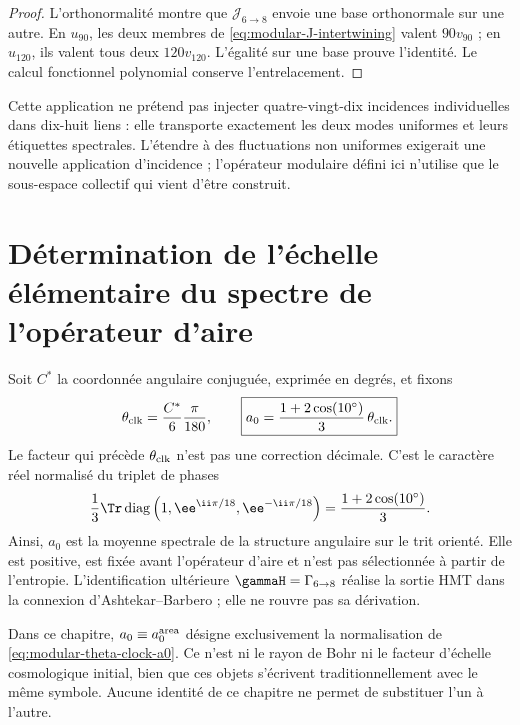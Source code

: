 \begin{proof}
L'orthonormalité montre que \(\mathcal J_{6\to8}\) envoie une base
orthonormale sur une autre. En \(u_{90}\), les deux membres de
\cref{eq:modular-J-intertwining} valent \(90v_{90}\) ; en \(u_{120}\),
ils valent tous deux \(120v_{120}\). L'égalité sur une base prouve l'identité.
Le calcul fonctionnel polynomial conserve l'entrelacement.
\end{proof}

Cette application ne prétend pas injecter quatre-vingt-dix incidences individuelles dans
dix-huit liens : elle transporte exactement les deux modes uniformes et leurs
étiquettes spectrales. L'étendre à des fluctuations non uniformes exigerait
une nouvelle application d'incidence ; l'opérateur modulaire défini ici n'utilise que
le sous-espace collectif qui vient d'être construit.

\section{Détermination de l'échelle élémentaire du spectre de l'opérateur d'aire}

Soit \(C^*\) la coordonnée angulaire conjuguée, exprimée en degrés, et fixons
\begin{equation}
\label{eq:modular-theta-clock-a0}
\theta_{\rm clk}=\frac{C^*}{6}\frac{\pi}{180},
\qquad
\boxed{
a_0=\frac{1+2\cos(10^\circ)}{3}\,\theta_{\rm clk}.}
\end{equation}
Le facteur qui précède \(\theta_{\rm clk}\) n'est pas une correction
décimale. C'est le caractère réel normalisé du triplet de phases
\begin{equation}
\label{eq:modular-c10-character}
\frac13\Tr\operatorname{diag}
\left(1,\ee^{\ii\pi/18},\ee^{-\ii\pi/18}\right)
=\frac{1+2\cos(10^\circ)}3.
\end{equation}
Ainsi, \(a_0\) est la moyenne spectrale de la structure angulaire sur le trit
orienté. Elle est positive, est fixée avant l'opérateur d'aire et n'est pas
sélectionnée à partir de l'entropie. L'identification ultérieure
\(\gammaH=\Gamma_{6\to8}\) réalise la sortie HMT dans la connexion
d'Ashtekar--Barbero \cite{Barbero,Immirzi} ; elle ne rouvre pas sa dérivation.

\begin{remark}
Dans ce chapitre, \(a_0\equiv a_0^{\rm area}\) désigne exclusivement la
normalisation de \cref{eq:modular-theta-clock-a0}. Ce n'est ni le rayon de Bohr
ni le facteur d'échelle cosmologique initial, bien que ces objets s'écrivent
traditionnellement avec le même symbole. Aucune identité de ce chapitre
ne permet de substituer l'un à l'autre.
\end{remark}

